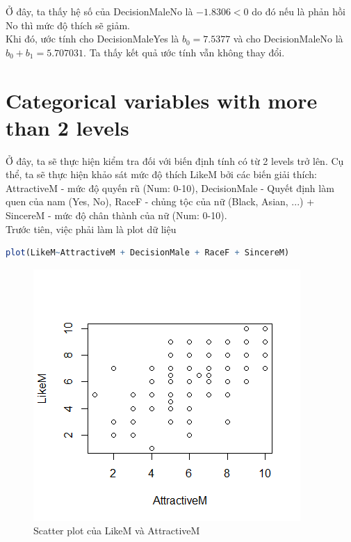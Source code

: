 \documentclass[a4paper,12pt]{article}
\begin{document}
	Ở đây, ta thấy hệ số của DecisionMaleNo là $-1.8306 < 0$ do đó nếu là phản hồi No thì mức độ thích sẽ giảm.\\
	
	Khi đó, ước tính cho DecisionMaleYes là $b_0 = 7.5377$ và cho DecisionMaleNo là $b_0 + b_1 = 5.707031$. Ta thấy kết quả ước tính vẫn không thay đổi.
	
	\section{Categorical variables with more than 2 levels}
	
	Ở đây, ta sẽ thực hiện kiểm tra đối với biến định tính có từ 2 levels trở lên. Cụ thể, ta sẽ thực hiện khảo sát mức độ thích LikeM bởi các biến giải thích: AttractiveM - mức độ quyến rũ (Num: 0-10),  DecisionMale - Quyết định làm quen của nam (Yes, No),  RaceF - chủng tộc của nữ (Black, Asian, ...) + SincereM - mức độ chân thành của nữ (Num: 0-10).\\
	
	Trước tiên, việc phải làm là plot dữ liệu
	\begin{lstlisting}[language=R]
	plot(LikeM~AttractiveM + DecisionMale + RaceF + SincereM)
	\end{lstlisting}
	
	\begin{figure}[H]
		\centering
		
			\includegraphics[width=0.7\linewidth]{Rplot1}
			\caption{Scatter plot của LikeM và AttractiveM}
			\label{fig:rplot1}
	\end{figure}
	
\end{document}
